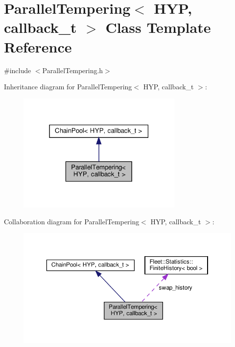 \hypertarget{class_parallel_tempering}{}\section{Parallel\+Tempering$<$ H\+YP, callback\+\_\+t $>$ Class Template Reference}
\label{class_parallel_tempering}


{\ttfamily \#include $<$Parallel\+Tempering.\+h$>$}



Inheritance diagram for Parallel\+Tempering$<$ H\+YP, callback\+\_\+t $>$\+:
\nopagebreak
\begin{figure}[H]
\begin{center}
\leavevmode
\includegraphics[width=231pt]{class_parallel_tempering__inherit__graph}
\end{center}
\end{figure}


Collaboration diagram for Parallel\+Tempering$<$ H\+YP, callback\+\_\+t $>$\+:
\nopagebreak
\begin{figure}[H]
\begin{center}
\leavevmode
\includegraphics[width=350pt]{class_parallel_tempering__coll__graph}
\end{center}
\end{figure}
